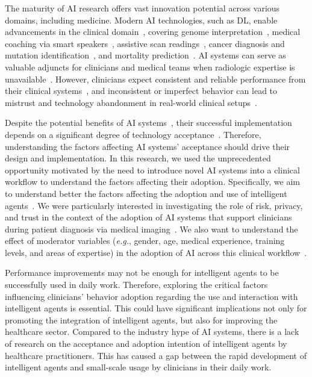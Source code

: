 The maturity of \ac{AI} research offers vast innovation potential across various domains, including medicine.
Modern AI technologies, such as \ac{DL}, enable advancements in the clinical domain~\cite{topol2019high}, covering genome interpretation~\cite{sundaram2018predicting}, medical coaching via smart speakers~\cite{CALISTO2022102922}, assistive scan readings~\cite{madani2018deep}, cancer diagnosis and mutation identification~\cite{Sollini2020}, and mortality prediction~\cite{ahmad2018death}.
\ac{AI} systems can serve as valuable adjuncts for clinicians and medical teams when radiologic expertise is unavailable~\cite{doi:10.1148/radiol.2020201874, doi:10.1148/radiol.2020190283}.
However, clinicians expect consistent and reliable performance from their clinical systems~\cite{CALISTO2022102922, Kocielnik:2019:YAI:3290605.3300641}, and inconsistent or imperfect behavior can lead to mistrust and technology abandonment in real-world clinical setups~\cite{benrimoh2018aifred, CALISTO2021102607, CALISTO2022102285}.

Despite the potential benefits of AI systems~\cite{10.1145/3290605.3300233}, their successful implementation depends on a significant degree of technology acceptance~\cite{CALISTO2022102922}.
Therefore, understanding the factors affecting AI systems' acceptance should drive their design and implementation.
In this research, we used the unprecedented opportunity motivated by the need to introduce novel AI systems into a clinical workflow to understand the factors affecting their adoption.
Specifically, we aim to understand better the factors affecting the adoption and use of intelligent agents~\cite{JUNGMANN2021834}.
We were particularly interested in investigating the role of risk, privacy, and trust in the context of the adoption of AI systems that support clinicians during patient diagnosis via medical imaging~\cite{CALISTO2021102607, Kocielnik:2019:YAI:3290605.3300641}.
We also want to understand the effect of moderator variables ({\it e.g.}, gender, age, medical experience, training levels, and areas of expertise) in the adoption of AI across this clinical workflow~\cite{CALISTO2022102922}.

Performance improvements may not be enough for intelligent agents to be successfully used in daily work.
Therefore, exploring the critical factors influencing clinicians’ behavior adoption regarding the use and interaction with intelligent agents is essential.
This could have significant implications not only for promoting the integration of intelligent agents, but also for improving the healthcare sector.
Compared to the industry hype of AI systems, there is a lack of research on the acceptance and adoption intention of intelligent agents by healthcare practitioners.
This has caused a gap between the rapid development of intelligent agents and small-scale usage by clinicians in their daily work.

